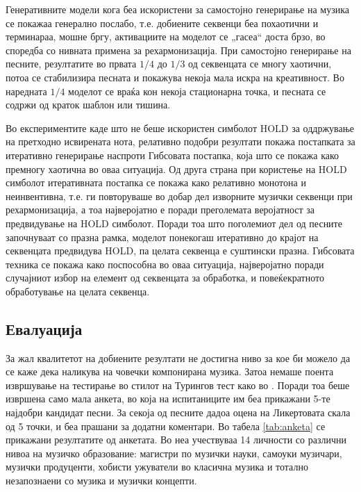 Генеративните модели кога беа искористени за самостојно генерирање на музика се покажаа генерално послабо, т.е. добиените секвенци беа похаотични и терминараа, мошне бргу, активациите на моделот се „гасеа“ доста брзо, во споредба со нивната примена за рехармонизација. При самостојно генерирање на песните, резултатите во првата $1/4$ до $1/3$ од секвенцата се многу хаотични, потоа се стабилизира песната и покажува некоја мала искра на креативност. Во наредната $1/4$ моделот се враќа кон некоја стационарна точка, и песната се содржи од краток шаблон или тишина.

Во експериментите каде што не беше искористен симболот HOLD за оддржување на претходно исвирената нота, релативно подобри резултати покажа постапката за итеративно генерирање наспроти Гибсовата постапка, која што се покажа како премногу хаотична во оваа ситуација. Од друга страна при користење на HOLD симболот итеративната постапка се покажа како релативно монотона и неинвентивна, т.е. ги повторуваше во добар дел изворните музички секвенци при рехармонизација, а тоа најверојатно е поради преголемата веројатност за предвидување на HOLD симболот. Поради тоа што поголемиот дел од песните започнуваат со празна рамка, моделот понекогаш итеративно до крајот на секвенцата предвидува HOLD, па целата секвенца е суштински празна. Гибсовата техника се покажа како поспособна во оваа ситуација, најверојатно поради случајниот избор на елемент од секвенцата за обработка, и повеќекратното обработување на целата секвенца. 

\subsection{Евалуација}

За жал квалитетот на добиените резултати не достигна ниво за кое би можело да се каже дека наликува на човечки компонирана музика. Затоа немаше поента извршување на тестирање во стилот на Турингов тест како во \cite{Hadjeres2016,Liang2017,Yang2017}. Поради тоа беше извршена само мала анкета, во која на испитаниците им беа прикажани 5-те најдобри кандидат песни. За секоја од песните дадоа оцена на Ликертовата скала од 5 точки, и беа прашани за додатни коментари. Во табела \ref{tab:anketa} се прикажани резултатите од анкетата. Во неа учествуваа 14 личности со различни нивоа на музичко образование: магистри по музички науки, самоуки музичари, музички продуценти, хобисти ужуватели во класична музика и тотално незапознаени со музика и музички концепти. 

